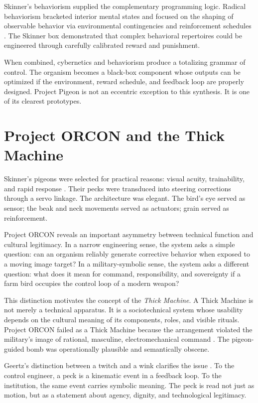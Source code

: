 \documentclass[runningheads]{llncs}
\begin{document}
Skinner's behaviorism supplied the complementary programming logic. Radical behaviorism bracketed interior mental states and focused on the shaping of observable behavior via environmental contingencies and reinforcement schedules \cite{skinner1953science}. The Skinner box demonstrated that complex behavioral repertoires could be engineered through carefully calibrated reward and punishment.

When combined, cybernetics and behaviorism produce a totalizing grammar of control. The organism becomes a black-box component whose outputs can be optimized if the environment, reward schedule, and feedback loop are properly designed. Project Pigeon is not an eccentric exception to this synthesis. It is one of its clearest prototypes.

\section{Project ORCON and the Thick Machine}

Skinner's pigeons were selected for practical reasons: visual acuity, trainability, and rapid response \cite{skinner1960pigeons}. Their pecks were transduced into steering corrections through a servo linkage. The architecture was elegant. The bird's eye served as sensor; the beak and neck movements served as actuators; grain served as reinforcement.

Project ORCON reveals an important asymmetry between technical function and cultural legitimacy. In a narrow engineering sense, the system asks a simple question: can an organism reliably generate corrective behavior when exposed to a moving image target? In a military-symbolic sense, the system asks a different question: what does it mean for command, responsibility, and sovereignty if a farm bird occupies the control loop of a modern weapon?

This distinction motivates the concept of the \emph{Thick Machine}. A Thick Machine is not merely a technical apparatus. It is a sociotechnical system whose usability depends on the cultural meaning of its components, roles, and visible rituals. Project ORCON failed as a Thick Machine because the arrangement violated the military's image of rational, masculine, electromechanical command \cite{schultzfigueroa2019project,wlodarczyk2020beyond}. The pigeon-guided bomb was operationally plausible and semantically obscene.

Geertz's distinction between a twitch and a wink clarifies the issue \cite{geertz1973interpretation}. To the control engineer, a peck is a kinematic event in a feedback loop. To the institution, the same event carries symbolic meaning. The peck is read not just as motion, but as a statement about agency, dignity, and technological legitimacy.
\end{document}
